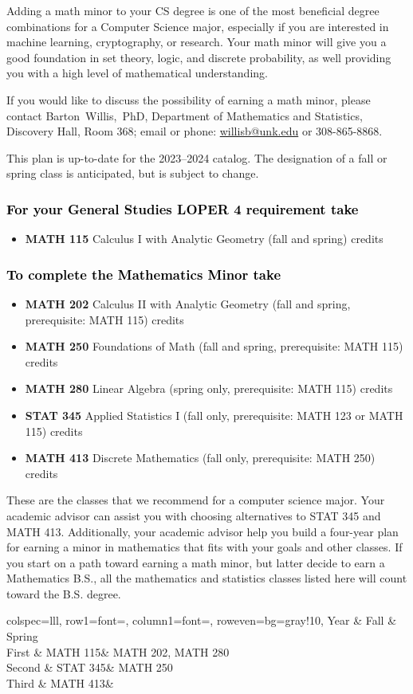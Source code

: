\documentclass[10pt]{article}
\makeatletter
\newcommand{\calcone}{\textbf{MATH 115} Calculus I with Analytic Geometry (fall and spring) \dotfill 5 credits}
\newcommand{\calconeshort}{MATH 115}
\newcommand{\calctwo}{\textbf{MATH 202} Calculus II with Analytic Geometry (fall and spring, prerequisite: MATH 115) \dotfill 5 credits }
\newcommand{\calctwoshort}{MATH 202}
\newcommand{\foundations}{\textbf{MATH 250} Foundations of Math (fall and spring, prerequisite: MATH 115)  \dotfill 3 credits}
\newcommand{\foundationsshort}{MATH 250}
\newcommand{\linear}{\textbf{MATH 280} Linear Algebra (spring only, prerequisite: MATH 115) \dotfill 3 credits}
\newcommand{\linearshort}{MATH 280}
\newcommand{\discrete}{\textbf{MATH 413} Discrete Mathematics  (fall only, prerequisite: MATH 250)\dotfill 3 credits}
\newcommand{\discreteshort}{MATH 413}
\newcommand{\appliedstat}{\textbf{STAT 345} Applied Statistics I (fall only, prerequisite: MATH 123 or MATH 115) \dotfill 3 credits}
\newcommand{\appliedstatshort}{STAT 345}
\newcommand{\contactbw}{\mbox{Barton Willis, PhD}, Department of Mathematics and Statistics,  Discovery Hall, Room 368;
email or phone: \href{mailto:willisb@unk.edu}{willisb@unk.edu} or 308-865-8868.}
\newcommand{\forinfo}[2]{If you would like to discuss the possibility of earning a math {#1}, please contact \contactbw}
\newcommand{\catalog}{2023--2024 }
\newcommand{\LOPER}{LOPER\xspace}
\newcommand{\uptodate}{This plan is up-to-date for  the \catalog catalog. The designation of a fall or spring class is 
anticipated, but  is subject to change.}
\newcommand{\mathminor}{      
\begin{table}[h]
  \caption*{Suggested Math Minor program of study}
   \center
  \begin{tblr}{
      colspec={lll},
      row{1}={font=\bfseries},
      column{1}={font=\itshape},
      row{even}={bg=gray!10},
    }
     Year        & Fall  & Spring   \\
    \toprule
    First & \calconeshort  & \calctwoshort, \linearshort  \\
    Second &  \appliedstatshort & \foundationsshort  \\
    Third & \discreteshort & \\
    \bottomrule
  \end{tblr}
\end{table}}
\makeatother
\begin{document}
Adding a math minor to your CS degree is one of the most beneficial degree combinations 
for a Computer Science major, especially if you are interested in machine learning, 
cryptography,  or research.  Your math minor will give you a good foundation in 
set theory, logic, and discrete probability, as well providing you with a high level of 
mathematical understanding. 

 
 \forinfo{minor}{Cyber Security Operations Comprehensive}

\uptodate
\vspace{-0.1in}

\subsubsection*{\textcolor{black}{For  your General Studies \LOPER 4 requirement take}}
\begin{itemize}
\item  \calcone
\end{itemize}

\subsubsection*{\textcolor{black}{To complete the Mathematics Minor take}}

\begin{itemize}
\item \calctwo
\item \foundations
\item \linear
\item \appliedstat
\item \discrete
\end{itemize}
\vspace{0.1in}
These are the classes that we recommend for a computer science major.
Your academic advisor can assist you with choosing alternatives 
to \appliedstatshort{} and \discreteshort{}. Additionally, your academic advisor help you build a four-year plan for earning 
a minor in mathematics that fits with your goals and other classes.  
If you start on a path toward earning a math minor, but latter decide to earn a  
Mathematics B.S., all the mathematics and statistics  
classes listed here will count toward the B.S. degree.
\mathminor
\end{document}
